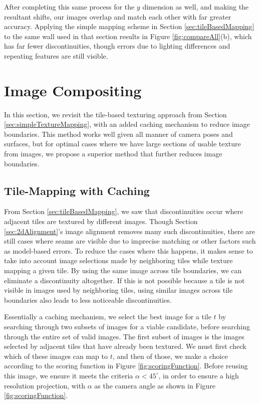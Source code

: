 \documentclass[]{spie}  %
\begin{document}
{After completing this same process for the $y$ dimension as well, and
making the resultant shifts, our images overlap and match each other
with far greater accuracy. Applying the simple mapping scheme in
Section \ref{sec:tileBasedMapping} to the same wall used in that
section results in Figure \ref{fig:compareAll}(b), which has far fewer
discontinuities, though errors due to lighting differences and
repeating features are still visible.

\section{Image Compositing}
\label{sec:imageCompositing}
In this section, we revisit the tile-based texturing approach from
Section \ref{sec:simpleTextureMapping}, with an added caching
mechanism to reduce image boundaries. This method works well given all
manner of camera poses and surfaces, but for optimal cases where we
have large sections of usable texture from images, we propose a
superior method that further reduces image boundaries.

\subsection{Tile-Mapping with Caching}
\label{sec:mappingWithCaching}
From Section \ref{sec:tileBasedMapping}, we saw that discontinuities
occur where adjacent tiles are textured by different images. Though
Section \ref{sec:2dAlignment}'s image alignment removes many such
discontinuities, there are still cases where seams are visible due to
imprecise matching or other factors such as model-based errors. To
reduce the cases where this happens, it makes sense to take into
account image selections made by neighboring tiles while texture
mapping a given tile. By using the same image across tile boundaries,
we can eliminate a discontinuity altogether. If this is not possible
because a tile is not visible in images used by neighboring tiles,
using similar images across tile boundaries also leads to less
noticeable discontinuities.

Essentially a caching mechanism, we select the best image for a tile
$t$ by searching through two subsets of images for a viable candidate,
before searching through the entire set of valid images. The first
subset of images is the images selected by adjacent tiles that have
already been textured. We must first check which of these images can
map to $t$, and then of those, we make a choice according to the
scoring function in Figure \ref{fig:scoringFunction}. Before reusing
this image, we ensure it meets the criteria $\alpha < 45^\circ$, in
order to ensure a high resolution projection, with $\alpha$ as the
camera angle as shown in Figure \ref{fig:scoringFunction}.

}
\end{document}
